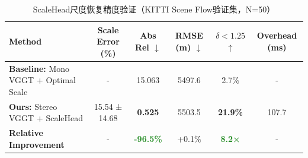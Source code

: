
\begin{table}[htbp]
\centering
\caption{ScaleHead尺度恢复精度验证（KITTI Scene Flow验证集，N=50）}
\label{tab:scalehead_evaluation}
\begin{tabular}{lccccc}
\toprule
\textbf{Method} & \textbf{Scale Error (\%)} & \textbf{Abs Rel $\downarrow$} & \textbf{RMSE (m) $\downarrow$} & \textbf{$\delta<1.25$ $\uparrow$} & \textbf{Overhead (ms)} \\
\midrule
\textbf{Baseline:} Mono VGGT + Optimal Scale & - & 15.063 & 5497.6 & 2.7\% & - \\
\textbf{Ours:} Stereo VGGT + ScaleHead & 15.54 ± 14.68 & \textbf{0.525} & 5503.5 & \textbf{21.9\%} & 107.7 \\
\midrule
\textbf{Relative Improvement} & - & \textcolor{ForestGreen}{\textbf{-96.5\%}} & +0.1\% & \textcolor{ForestGreen}{\textbf{8.2×}} & - \\
\bottomrule
\end{tabular}
\end{table}
